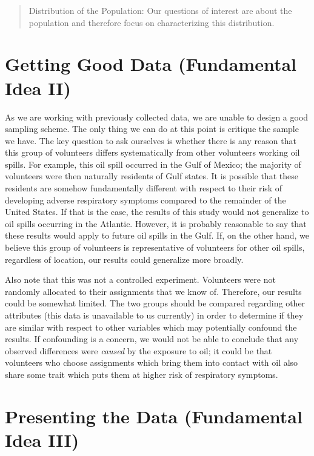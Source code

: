 \documentclass[
  letterpaper,
  DIV=11,
  numbers=noendperiod]{scrreprt}
\theoremstyle{definition}
\theoremstyle{definition}
\theoremstyle{plain}
\theoremstyle{remark}
\begin{document}
\begin{quote}
Distribution of the Population: Our questions of interest are about the
population and therefore focus on characterizing this distribution.
\end{quote}

\section{Getting Good Data (Fundamental Idea
II)}\label{getting-good-data-fundamental-idea-ii}

As we are working with previously collected data, we are unable to
design a good sampling scheme. The only thing we can do at this point is
critique the sample we have. The key question to ask ourselves is
whether there is any reason that this group of volunteers differs
systematically from other volunteers working oil spills. For example,
this oil spill occurred in the Gulf of Mexico; the majority of
volunteers were then naturally residents of Gulf states. It is possible
that these residents are somehow fundamentally different with respect to
their risk of developing adverse respiratory symptoms compared to the
remainder of the United States. If that is the case, the results of this
study would not generalize to oil spills occurring in the Atlantic.
However, it is probably reasonable to say that these results would apply
to future oil spills in the Gulf. If, on the other hand, we believe this
group of volunteers is representative of volunteers for other oil
spills, regardless of location, our results could generalize more
broadly.

Also note that this was not a controlled experiment. Volunteers were not
randomly allocated to their assignments that we know of. Therefore, our
results could be somewhat limited. The two groups should be compared
regarding other attributes (this data is unavailable to us currently) in
order to determine if they are similar with respect to other variables
which may potentially confound the results. If confounding is a concern,
we would not be able to conclude that any observed differences were
\emph{caused} by the exposure to oil; it could be that volunteers who
choose assignments which bring them into contact with oil also share
some trait which puts them at higher risk of respiratory symptoms.

\section{Presenting the Data (Fundamental Idea
III)}\label{presenting-the-data-fundamental-idea-iii}
\end{document}
